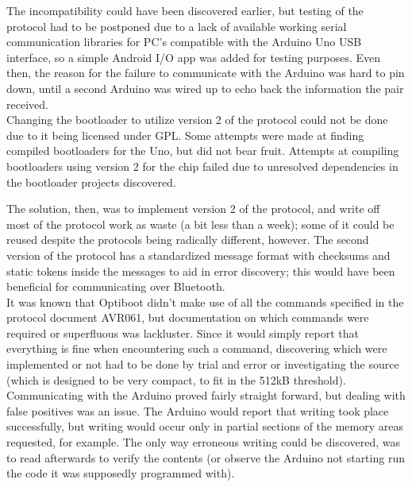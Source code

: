 The incompatibility could have been discovered earlier, but testing of the protocol had to be postponed due to a lack of available working serial communication libraries for PC's compatible with the Arduino Uno USB interface, so a simple Android I/O app was added for testing purposes. Even then, the reason for the failure to communicate with the Arduino was hard to pin down, until a second Arduino was wired up to echo back the information the pair received.\\

Changing the bootloader to utilize version 2 of the protocol could not be done due to it being licensed under GPL. Some attempts were made at finding compiled bootloaders for the Uno, but did not bear fruit. Attempts at compiling bootloaders using version 2 for the chip failed due to unresolved dependencies in the bootloader projects discovered. %

The solution, then, was to implement version 2 of the protocol, and write off most of the protocol work as waste (a bit less than a week); some of it could be reused despite the protocols being radically different, however. The second version of the protocol has a standardized message format with checksums and static tokens inside the messages to aid in error discovery; this would have been beneficial for communicating over Bluetooth.\\

It was known that Optiboot didn't make use of all the commands specified in the protocol document AVR061\cite{AVR061}, but documentation on which commands were required or superfluous was lackluster. Since it would simply report that everything is fine when encountering such a command, discovering which were implemented or not had to be done by trial and error or investigating the source (which is designed to be very compact, to fit in the 512kB threshold).\\

Communicating with the Arduino proved fairly straight forward, but dealing with false positives was an issue.
The Arduino would report that writing took place successfully, but writing would occur only in partial sections of the memory areas requested, for example. The only way erroneous writing could be discovered, was to read afterwards to verify the contents (or observe the Arduino not starting run the code it was supposedly programmed with).\\

